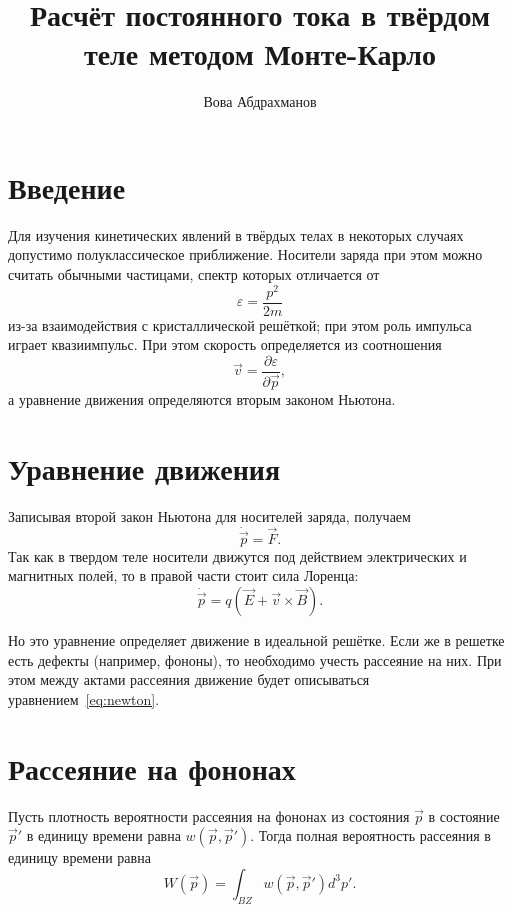 \documentclass{article}
\begin{document}
\author{Вова Абдрахманов}
\title{Расчёт постоянного тока в твёрдом теле методом Монте-Карло}
\maketitle
\tableofcontents
\newpage
\section{Введение}
Для изучения кинетических явлений в твёрдых телах в некоторых случаях допустимо полуклассическое приближение. Носители заряда при этом можно считать обычными частицами, спектр которых отличается от
\begin{equation}
    \varepsilon = \frac{p^2}{2m}
\end{equation}
из-за взаимодействия с кристаллической решёткой; при этом роль импульса играет квазиимпульс. При этом скорость определяется из соотношения
\begin{equation}
    \vec{v} = \frac{\partial \varepsilon}{\partial \vec{p}},
\end{equation}
а уравнение движения определяются вторым законом Ньютона.

\section{Уравнение движения}
Записывая второй закон Ньютона для носителей заряда, получаем
\begin{equation}
    \dot{\vec{p}} = \vec{F}.
\end{equation}
Так как в твердом теле носители движутся под действием электрических и магнитных полей, то в правой части стоит сила Лоренца:
\begin{equation}
    \dot{\vec{p}} = q\left(\vec{E} + \vec{v}\times\vec{B}\right).
    \label{eq:newton}
\end{equation}

Но это уравнение определяет движение в идеальной решётке. Если же в решетке есть дефекты (например, фононы), то необходимо учесть рассеяние на них. При этом между актами рассеяния движение будет описываться уравнением~\eqref{eq:newton}.

\section{Рассеяние на фононах}
Пусть плотность вероятности рассеяния на фононах из состояния \( \vec{p} \) в состояние \( \vec{p}' \) в единицу времени равна \( w(\vec{p}, \vec{p}') \). Тогда полная вероятность рассеяния в единицу времени равна 
\begin{equation}
    W(\vec{p}) = \int_{BZ} w(\vec{p}, \vec{p}') d^3 p'.
\end{equation}
\end{document}
